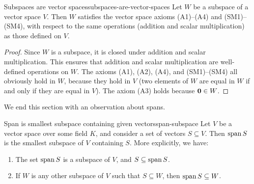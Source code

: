 \begin{proposition}{Subspaces are vector spaces}{subspaces-are-vector-spaces}
  Let $W$ be a subspace of a vector space $V$. Then $W$ satisfies the
  vector space axioms (A1)--(A4) and (SM1)--(SM4), with respect to the
  same operations (addition and scalar multiplication) as those
  defined on $V$.
\end{proposition}

\begin{proof}
  Since $W$ is a subspace, it is closed under addition and scalar
  multiplication. This ensures that addition and scalar multiplication
  are well-defined operations on $W$. The axioms (A1), (A2), (A4), and
  (SM1)--(SM4) all obviously hold in $W$, because they hold in $V$
  (two elements of\/ $W$ are equal in $W$ if and only if they are equal
  in $V$). The axiom (A3) holds because $\mbox{\bf 0}\in W$.
\end{proof}

We end this section with an observation about spans.

\begin{proposition}{Span is smallest subspace containing given vectors}{span-subspace}
  Let $V$ be a vector space over some field $K$, and consider a set of
  vectors $S\subseteq V$. Then $\sspan S$ is the smallest subspace of\/
  $V$ containing $S$. More explicitly, we have:
  \begin{enumialphparenastyle}
    \begin{enumerate}
    \item The set $\sspan S$ is a subspace of\/ $V$, and
      $S\subseteq \sspan S$.
    \item If $W$ is any other subspace of\/ $V$ such that
      $S\subseteq W$, then $\sspan S\subseteq W$.
    \end{enumerate}
  \end{enumialphparenastyle}
\end{proposition}


